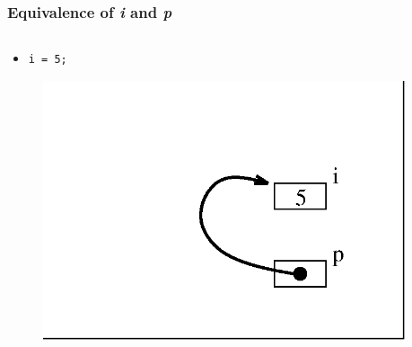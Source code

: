\begin{frame}[fragile]
\frametitle{Equivalence of {\em i} and {\em *p}}
\begin{columns}[T]

\begin{column}{0.45\textwidth}
\begin{itemize}[<+->]
\item 
\begin{verbatim}
i = 5;
\end{verbatim}
\end{itemize}
\begin{center}
\begin{figure}[h]
\centerline{
\includegraphics[scale=0.40]{../Figs/point8_4.eps}
}
\end{figure}
\end{center}
\end{column}

\pause
\begin{column}{0.45\textwidth}

\end{column}

\end{columns}
\end{frame}


